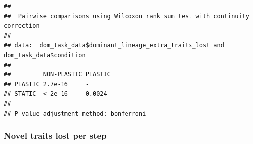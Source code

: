 \documentclass[]{book}
\newenvironment{Shaded}{\begin{snugshade}}{\end{snugshade}}
\newcommand{\DataTypeTok}[1]{\textcolor[rgb]{0.13,0.29,0.53}{#1}}
\newcommand{\FloatTok}[1]{\textcolor[rgb]{0.00,0.00,0.81}{#1}}
\newcommand{\KeywordTok}[1]{\textcolor[rgb]{0.13,0.29,0.53}{\textbf{#1}}}
\newcommand{\NormalTok}[1]{#1}
\newcommand{\OperatorTok}[1]{\textcolor[rgb]{0.81,0.36,0.00}{\textbf{#1}}}
\newcommand{\OtherTok}[1]{\textcolor[rgb]{0.56,0.35,0.01}{#1}}
\newcommand{\StringTok}[1]{\textcolor[rgb]{0.31,0.60,0.02}{#1}}
\begin{document}
\begin{Shaded}
\end{Shaded}

\begin{verbatim}
## 
##  Pairwise comparisons using Wilcoxon rank sum test with continuity correction 
## 
## data:  dom_task_data$dominant_lineage_extra_traits_lost and dom_task_data$condition 
## 
##         NON-PLASTIC PLASTIC
## PLASTIC 2.7e-16     -      
## STATIC  < 2e-16     0.0024 
## 
## P value adjustment method: bonferroni
\end{verbatim}

\hypertarget{novel-traits-lost-per-step}{%
\subsubsection{Novel traits lost per step}\label{novel-traits-lost-per-step}}
\end{document}
